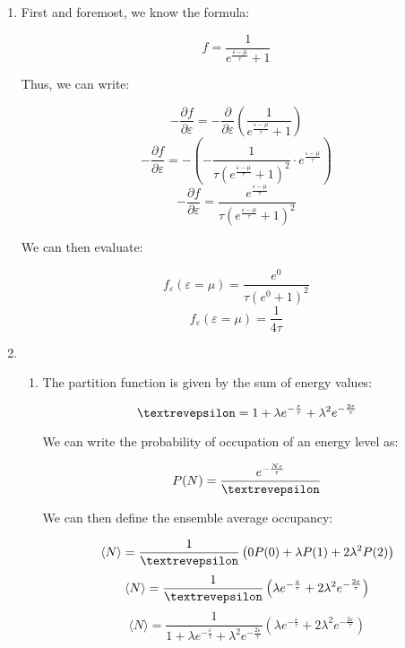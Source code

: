 \begin{enumerate}

  \item

    First and foremost, we know the formula:

    $$f=\frac{1}{e^{\frac{\varepsilon-\mu}{\tau}}+1}$$

    Thus, we can write:

    $$-\frac{\partial f}{\partial \varepsilon}=-\frac{\partial}{\partial \varepsilon}\left( \frac{1}{e^{\frac{\varepsilon-\mu}{\tau}}+1} \right)$$
    $$-\frac{\partial f}{\partial \varepsilon}=-\left( -\frac{1}{\tau \left(e^{\frac{\varepsilon-\mu}{\tau}}+1\right)^2} \cdot e^{\frac{\varepsilon-\mu}{\tau}}\right)$$
    $$-\frac{\partial f}{\partial \varepsilon}=\frac{e^{\frac{\varepsilon-\mu}{\tau}}}{\tau \left(e^{\frac{\varepsilon-\mu}{\tau}}+1\right)^2}$$

    We can then evaluate:

    $$f_\varepsilon(\varepsilon=\mu)=\frac{e^0}{\tau\left( e^0+1 \right)^2}$$
    $$\boxed{f_\varepsilon(\varepsilon=\mu)=\frac{1}{4\tau}}$$

    \setcounter{enumi}{2}

  \item

    \begin{enumerate}

      \item 

        The partition function is given by the sum of energy values:

        $$\text{\textrevepsilon}=1+\lambda e^{-\frac{\varepsilon}{\tau}}+\lambda^2e^{-\frac{2\varepsilon}{\tau}}$$

        We can write the probability of occupation of an energy level as:

        $$P(N)=\frac{e^{-\frac{N\varepsilon}{\tau}}}{\text{\textrevepsilon}}$$

        We can then define the ensemble average occupancy:

        $$\langle N\rangle=\frac{1}{\text{\textrevepsilon}}\left( 0P(0) + \lambda P(1) + 2\lambda^2 P(2) \right)$$
        $$\langle N\rangle=\frac{1}{\text{\textrevepsilon}}\left(\lambda e^{-\frac{\varepsilon}{\tau}} + 2\lambda^2 e^{-\frac{2\varepsilon}{\tau}} \right)$$
        $$\boxed{\langle N\rangle=\frac{1}{1+\lambda e^{-\frac{\varepsilon}{\tau}}+\lambda^2 e^{-\frac{2\varepsilon}{\tau}}}\left(\lambda e^{-\frac{\varepsilon}{\tau}} + 2\lambda^2 e^{-\frac{2\varepsilon}{\tau}} \right)}$$


\end{enumerate}
\end{enumerate}
